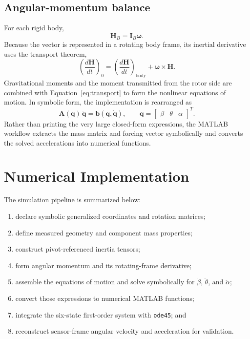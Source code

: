 \documentclass[11pt]{article}
\newcommand{\vect}[1]{\bm{#1}}
\newcommand{\mat}[1]{\bm{#1}}
\begin{document}
\subsection{Angular-momentum balance}
For each rigid body,
\begin{equation}
    \vect{H}_{B}=\mat{I}_{B}\vect{\omega}.
\end{equation}
Because the vector is represented in a rotating body frame, its inertial derivative uses the transport theorem,
\begin{equation}
    \left(\frac{d\vect{H}}{dt}\right)_{0}
    =\left(\frac{d\vect{H}}{dt}\right)_{\mathrm{body}}
    +\vect{\omega}\times\vect{H}.
\label{eq:transport}
\end{equation}
Gravitational moments and the moment transmitted from the rotor side are combined with Equation~\eqref{eq:transport} to form the nonlinear equations of motion. In symbolic form, the implementation is rearranged as
\begin{equation}
    \mat{A}(\vect{q})\,\ddot{\vect{q}}
    = \vect{b}(\vect{q},\dot{\vect{q}}),
    \qquad
    \vect{q}=\begin{bmatrix}\beta&\theta&\alpha\end{bmatrix}^{T}.
\label{eq:mass_matrix}
\end{equation}
Rather than printing the very large closed-form expressions, the MATLAB workflow extracts the mass matrix and forcing vector symbolically and converts the solved accelerations into numerical functions.

\section{Numerical Implementation}
The simulation pipeline is summarized below:
\begin{enumerate}[leftmargin=1.55em,itemsep=0.35em]
    \item declare symbolic generalized coordinates and rotation matrices;
    \item define measured geometry and component mass properties;
    \item construct pivot-referenced inertia tensors;
    \item form angular momentum and its rotating-frame derivative;
    \item assemble the equations of motion and solve symbolically for $\ddot{\beta}$, $\ddot{\theta}$, and $\ddot{\alpha}$;
    \item convert those expressions to numerical MATLAB functions;
    \item integrate the six-state first-order system with \texttt{ode45}; and
    \item reconstruct sensor-frame angular velocity and acceleration for validation.
\end{enumerate}
\end{document}
